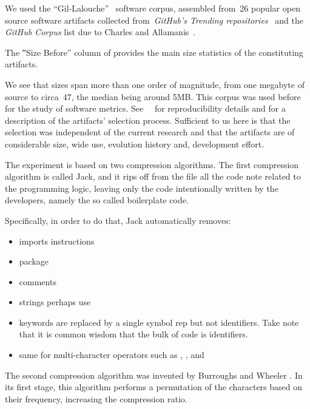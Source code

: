 We used the ``Gil-Lalouche''~\cite{Gil:Lalouche:2016} software corpus,
assembled from~26 popular \Java open source software artifacts collected
from~\emph{GitHub's Trending
repositories}~ and 
the \emph{GitHub \Java Corpus} list due to Charles and
Allamanis~\cite{Charles:Allamanis:2013}.

The ‟Size Before” column of  provides the main size
statistics of the constituting artifacts.

\begin{table}
  \label{table:corpus}
  \caption{Aggregating statistics of size of software artifacts in the data corpus, 
    before and after Burroughs-Wheeler compression}
  \centering
\end{table}

We see that sizes span more than one order of magnitude, from one megabyte of
source to circa~47, the median being around 5MB. This corpus was used before for
the study of software metrics.
See~\cite{Gil:Lalouche:2016}~\cite{Matteo:Cite:Gal:SecondPaper} for
reproducibility details and for a description of the artifacts' selection
process. Sufficient to us here is that the selection was independent of the
current research and that the artifacts are of considerable size, wide use, evolution history 
and, development effort.


The experiment is based on two compression algorithms.
The first compression algorithm is called Jack, and it rips off from the file all the code note related to the programming logic, leaving
only the code intentionally written by the developers, namely the so called boilerplate code.

Specifically, in order to do that, Jack automatically removes:

\begin{itemize}
  \item imports instructions
  \item package
  \item comments
  \item strings perhaps use
  \item keywords are replaced by a single symbol rep
        but not identifiers. Take note that it is common wisdom that the bulk of code is identifiers.
  \item same for multi-character operators such as \cc{->}, \cc{[]}, and \cc{<<<<=}
\end{itemize}

The second compression algorithm was invented by Burroughs and Wheeler
\cite{Burrows:Wheeler:94}. In its first stage, this algorithm performs a
permutation of the characters based on their frequency, increasing the
compression ratio.


